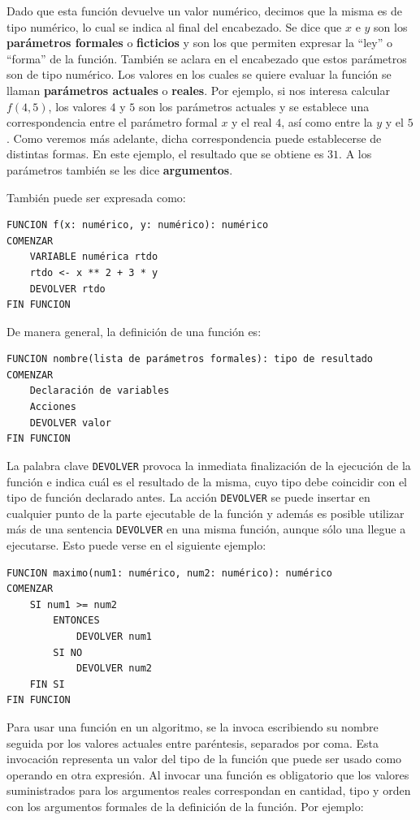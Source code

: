 \documentclass[]{book}
\begin{document}
Dado que esta función devuelve un valor numérico, decimos que la misma
es de tipo numérico, lo cual se indica al final del encabezado. Se dice
que \(x\) e \(y\) son los \textbf{parámetros formales} o
\textbf{ficticios} y son los que permiten expresar la ``ley'' o
``forma'' de la función. También se aclara en el encabezado que estos
parámetros son de tipo numérico. Los valores en los cuales se quiere
evaluar la función se llaman \textbf{parámetros actuales} o
\textbf{reales}. Por ejemplo, si nos interesa calcular \(f(4, 5)\), los
valores \(4\) y \(5\) son los parámetros actuales y se establece una
correspondencia entre el parámetro formal \(x\) y el real \(4\), así
como entre la \(y\) y el \(5\). Como veremos más adelante, dicha
correspondencia puede establecerse de distintas formas. En este ejemplo,
el resultado que se obtiene es \(31\). A los parámetros también se les
dice \textbf{argumentos}.

También puede ser expresada como:

\begin{verbatim}
FUNCION f(x: numérico, y: numérico): numérico
COMENZAR
    VARIABLE numérica rtdo
    rtdo <- x ** 2 + 3 * y
    DEVOLVER rtdo
FIN FUNCION
\end{verbatim}

De manera general, la definición de una función es:

\begin{verbatim}
FUNCION nombre(lista de parámetros formales): tipo de resultado
COMENZAR
    Declaración de variables
    Acciones
    DEVOLVER valor
FIN FUNCION
\end{verbatim}

La palabra clave \texttt{DEVOLVER} provoca la inmediata finalización de
la ejecución de la función e indica cuál es el resultado de la misma,
cuyo tipo debe coincidir con el tipo de función declarado antes. La
acción \texttt{DEVOLVER} se puede insertar en cualquier punto de la
parte ejecutable de la función y además es posible utilizar más de una
sentencia \texttt{DEVOLVER} en una misma función, aunque sólo una llegue
a ejecutarse. Esto puede verse en el siguiente ejemplo:

\begin{verbatim}
FUNCION maximo(num1: numérico, num2: numérico): numérico
COMENZAR
    SI num1 >= num2
        ENTONCES
            DEVOLVER num1
        SI NO
            DEVOLVER num2
    FIN SI
FIN FUNCION
\end{verbatim}

Para usar una función en un algoritmo, se la invoca escribiendo su
nombre seguida por los valores actuales entre paréntesis, separados por
coma. Esta invocación representa un valor del tipo de la función que
puede ser usado como operando en otra expresión. Al invocar una función
es obligatorio que los valores suministrados para los argumentos reales
correspondan en cantidad, tipo y orden con los argumentos formales de la
definición de la función. Por ejemplo:
\end{document}
